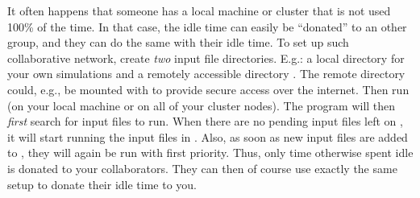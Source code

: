 It often happens that someone has a local machine or cluster that is not used 100\% of the time. In that case, the idle time can easily be ``donated'' to an other group, and they can do the same with their idle time. To set up such collaborative network, create \emph{two} input file directories. E.g.: a local directory  for your own simulations and a remotely accessible directory . The remote directory could, e.g., be mounted with  to provide secure access over the internet. Then run \prog {} (on your local machine or on all of your cluster nodes). The program will then \emph{first} search  for input files to run. When there are no pending input files left on , it will start running the input files in . Also, as soon as new input files are added to , they will again be run with first priority. Thus, only time otherwise spent idle is donated to your collaborators. They can then of course use exactly the same setup to donate their idle time to you.